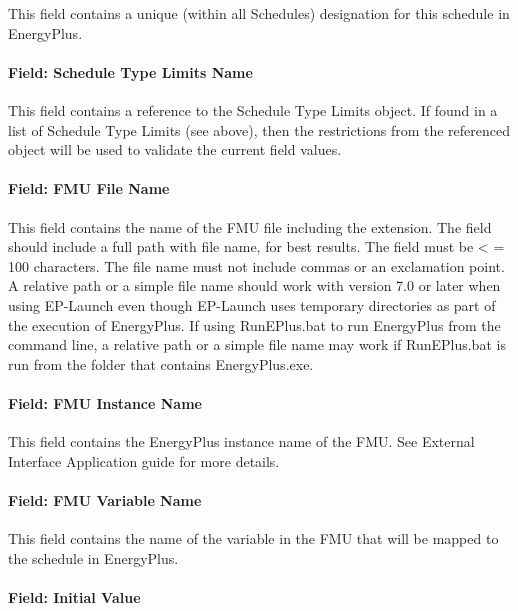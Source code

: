 This field contains a unique (within all Schedules) designation for this schedule in EnergyPlus.

\paragraph{Field: Schedule Type Limits Name}\label{field-schedule-type-limits-name-1}

This field contains a reference to the Schedule Type Limits object. If found in a list of Schedule Type Limits (see above), then the restrictions from the referenced object will be used to validate the current field values.

\paragraph{Field: FMU File Name}\label{field-fmu-file-name-2}

This field contains the name of the FMU file including the extension. The field should include a full path with file name, for best results. The field must be \textless{} = 100 characters. The file name must not include commas or an exclamation point. A relative path or a simple file name should work with version 7.0 or later when using EP-Launch even though EP-Launch uses temporary directories as part of the execution of EnergyPlus. If using RunEPlus.bat to run EnergyPlus from the command line, a relative path or a simple file name may work if RunEPlus.bat is run from the folder that contains EnergyPlus.exe.

\paragraph{Field: FMU Instance Name}\label{field-fmu-instance-name-1}

This field contains the EnergyPlus instance name of the FMU. See External Interface Application guide for more details.

\paragraph{Field: FMU Variable Name}\label{field-fmu-variable-name-1}

This field contains the name of the variable in the FMU that will be mapped to the schedule in EnergyPlus.

\paragraph{Field: Initial Value}\label{field-initial-value-3}

